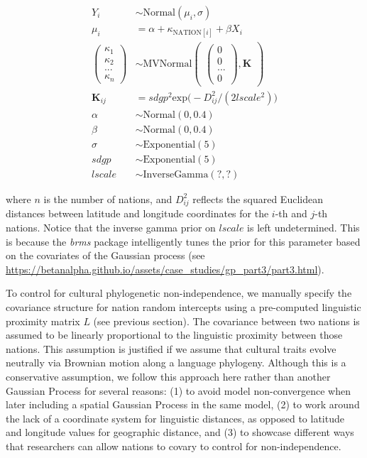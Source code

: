 \documentclass[
  man,floatsintext]{apa6}
\begin{document}
\begin{align}
Y_{i} &\sim \text{Normal}(\mu_{i},\sigma) \\
\mu_{i} &= \alpha + \kappa_{\text{NATION}[i]} + \beta X_{i} \nonumber \\
\begin{pmatrix}
\kappa_{1} \\ \kappa_{2} \\  ... \\ \kappa_{n}
\end{pmatrix} &\sim \text{MVNormal}
\begin{pmatrix}
\begin{pmatrix}
0 \\ 0 \\ ... \\ 0
\end{pmatrix},\textbf{K}
\end{pmatrix} \nonumber \\
\textbf{K}_{ij} &= sdgp^2 \text{exp} \big (-D_{ij}^2 / (2 lscale^2) \big ) \nonumber \\
\alpha &\sim \text{Normal}(0, 0.4) \nonumber \\
\beta &\sim \text{Normal}(0, 0.4) \nonumber \\
\sigma &\sim \text{Exponential}(5) \nonumber \\
sdgp &\sim \text{Exponential}(5) \nonumber \\
lscale &\sim \text{InverseGamma}(?,?) \nonumber 
\end{align}

where \(n\) is the number of nations, and \(D^2_{ij}\) reflects the squared Euclidean distances between latitude and longitude coordinates for the \(i\)-th and \(j\)-th nations. Notice that the inverse gamma prior on \(lscale\) is left undetermined. This is because the \emph{brms} package intelligently tunes the prior for this parameter based on the covariates of the Gaussian process (see \url{https://betanalpha.github.io/assets/case_studies/gp_part3/part3.html}).

To control for cultural phylogenetic non-independence, we manually specify the covariance structure for nation random intercepts using a pre-computed linguistic proximity matrix \(L\) (see previous section). The covariance between two nations is assumed to be linearly proportional to the linguistic proximity between those nations. This assumption is justified if we assume that cultural traits evolve neutrally via Brownian motion along a language phylogeny. Although this is a conservative assumption, we follow this approach here rather than another Gaussian Process for several reasons: (1) to avoid model non-convergence when later including a spatial Gaussian Process in the same model, (2) to work around the lack of a coordinate system for linguistic distances, as opposed to latitude and longitude values for geographic distance, and (3) to showcase different ways that researchers can allow nations to covary to control for non-independence.
\end{document}
